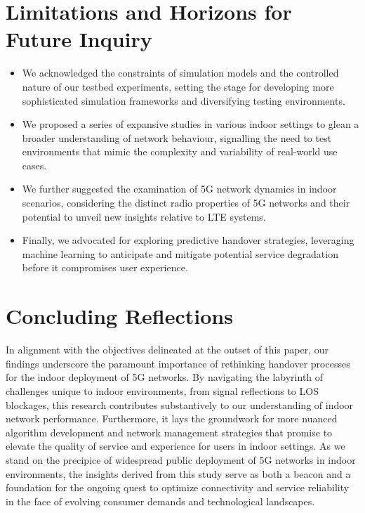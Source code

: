\section{Limitations and Horizons for Future Inquiry}
\begin{itemize}
    \item We acknowledged the constraints of simulation models and the controlled nature of our testbed experiments, setting the stage for developing more sophisticated simulation frameworks and diversifying testing environments.
    \item We proposed a series of expansive studies in various indoor settings to glean a broader understanding of network behaviour, signalling the need to test environments that mimic the complexity and variability of real-world use cases.
    \item We further suggested the examination of 5G network dynamics in indoor scenarios, considering the distinct radio properties of 5G networks and their potential to unveil new insights relative to LTE systems.
    \item Finally, we advocated for exploring predictive handover strategies, leveraging machine learning to anticipate and mitigate potential service degradation before it compromises user experience.
\end{itemize}

\section{Concluding Reflections}
In alignment with the objectives delineated at the outset of this paper, our findings underscore the paramount importance of rethinking handover processes for the indoor deployment of 5G networks. By navigating the labyrinth of challenges unique to indoor environments, from signal reflections to LOS blockages, this research contributes substantively to our understanding of indoor network performance. Furthermore, it lays the groundwork for more nuanced algorithm development and network management strategies that promise to elevate the quality of service and experience for users in indoor settings. As we stand on the precipice of widespread public deployment of 5G networks in indoor environments, the insights derived from this study serve as both a beacon and a foundation for the ongoing quest to optimize connectivity and service reliability in the face of evolving consumer demands and technological landscapes.
